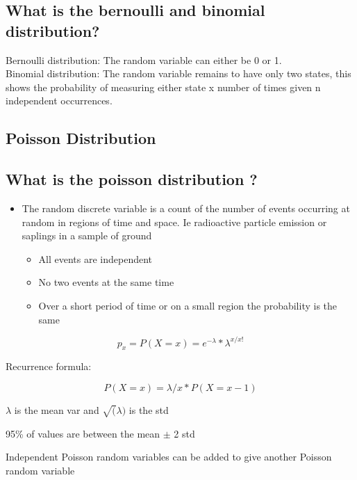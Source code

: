 \documentclass[11pt]{scrartcl} %
\begin{document}
\subsection{What is the bernoulli and binomial distribution?}

Bernoulli distribution: The random variable can either be 0 or 1.\\

Binomial distribution: The random variable remains to have only two
states, this shows the probability of measuring either state x number of
times given n independent occurrences.

\subsection{Poisson Distribution}

\subsection{What is the poisson distribution
?}

\begin{itemize}
\item The random discrete variable is a count of the number of events occurring
  at random in regions of time and space. Ie radioactive particle emission or saplings in a sample of
  ground

  \begin{itemize}
  \item All events are independent
  \item No two events at the same time
  \item Over a short period of time or on a small region the probability is
    the same
  \end{itemize}
\end{itemize}

\begin{equation}
	p_x = P(X=x) = e^{-\lambda} *\lambda^{x/x!}
\end{equation}

Recurrence formula:

\begin{equation}
	P(X=x) = \lambda/x * P(X= x-1)
\end{equation}

\(\lambda\) is the mean var and \(\sqrt(\lambda)\) is the std

95\% of values are between the mean \(\pm\) 2 std

Independent Poisson random variables can be added to give another
Poisson random variable
\end{document}

